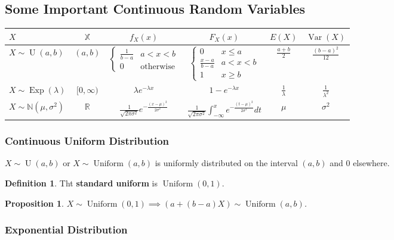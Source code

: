 \documentclass[12pt]{article}
\newtheorem*{prop*}{Proposition}
\theoremstyle{definition}
\newtheorem*{defn*}{Definition}
\newcommand{\R}{\mathbb{R}}
\newcommand{\N}{\mathbb{N}}
\newcommand{\X}{\mathbb{X}}
\DeclareMathOperator{\Var}{Var}
\DeclareMathOperator{\U}{U}
\DeclareMathOperator{\Uniform}{Uniform}
\DeclareMathOperator{\Exp}{Exp}
\begin{document}
\subsection{Some Important Continuous Random Variables}

\begin{tabular}{lccccc}
  \toprule
  $X$                        & $\X$     & $f_X(x)$ & $F_X(x)$ & $E(X)$ & $\Var(X)$ \\
  \midrule
  $X \sim \U(a, b)$    & $(a, b)$ & $\begin{cases}\frac{1}{b - a} & a < x < b \\ 0 & \text{otherwise}\end{cases}$ & $\begin{cases}0 & x \leq a \\ \frac{x - a}{b - a} & a < x < b \\ 1 & x \geq b\end{cases}$ & $\frac{a + b}{2}$ & $\frac{(b - a)^2}{12}$\\
  $X \sim \Exp(\lambda)$     & $[0, \infty)$ & $\lambda e^{-\lambda x}$ & $1 - e^{-\lambda x}$ & $\frac{1}{\lambda}$ & $\frac{1}{\lambda^2}$ \\
  $X \sim \N(\mu, \sigma^2)$ & $\R$ & $\frac{1}{\sqrt{2\pi\sigma^2}}e^{-\frac{(x - \mu)^2}{2\sigma^2}}$ & $\frac{1}{\sqrt{2\pi\sigma^2}}\int_{-\infty}^xe^{-\frac{(t - \mu)^2}{2\sigma^2}}dt$ & $\mu$ & $\sigma^2$ \\
  \bottomrule
\end{tabular}

\subsubsection{Continuous Uniform Distribution}

$X \sim \U(a, b)$ or $X \sim \Uniform(a, b)$ is uniformly distributed on the interval $(a, b)$ and 0 elsewhere.

\begin{defn*}
  Tht \textbf{standard uniform} is $\Uniform(0, 1)$.
\end{defn*}

\begin{prop*}
  $X \sim \Uniform(0, 1) \implies (a + (b - a)X) \sim \Uniform(a, b)$.
\end{prop*}

\subsubsection{Exponential Distribution}
\end{document}
